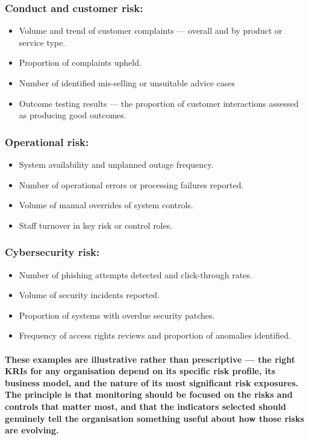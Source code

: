 \subsubsection{Conduct and customer risk:}
\begin{itemize}
    \item{Volume and trend of customer complaints — overall and by product or service type.}
    \item{Proportion of complaints upheld.}
    \item{Number of identified mis-selling or unsuitable advice cases}
    \item{Outcome testing results — the proportion of customer interactions assessed as producing good outcomes.}
\end{itemize}
\subsubsection{Operational risk:}
\begin{itemize}
    \item{System availability and unplanned outage frequency.}
    \item{Number of operational errors or processing failures reported.}
    \item{Volume of manual overrides of system controls.}
    \item{Staff turnover in key risk or control roles.}
\end{itemize}
\subsubsection{Cybersecurity risk:}
\begin{itemize}
    \item{Number of phishing attempts detected and click-through rates.}
    \item{Volume of security incidents reported.}
    \item{Proportion of systems with overdue security patches.}
    \item{Frequency of access rights reviews and proportion of anomalies identified.}
\end{itemize}
\paragraph{These examples are illustrative rather than prescriptive — the right KRIs for any organisation depend on its specific risk profile, its business model, and the nature of its most significant risk exposures. The principle is that monitoring should be focused on the risks and controls that matter most, and that the indicators selected should genuinely tell the organisation something useful about how those risks are evolving.}

